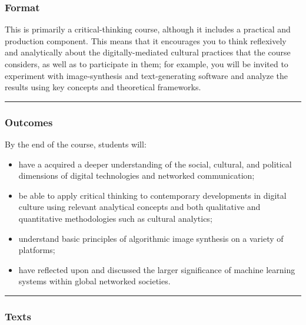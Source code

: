 \documentclass[
  letterpaper,
  DIV=11,
  numbers=noendperiod]{scrartcl}
\providecommand{\tightlist}{%
  \setlength{\itemsep}{0pt}\setlength{\parskip}{0pt}}\usepackage{longtable,booktabs,array}
\begin{document}
\hypertarget{format}{%
\subsubsection{Format}\label{format}}

This is primarily a critical-thinking course, although it includes a
practical and production component. This means that it encourages you to
think reflexively and analytically about the digitally-mediated cultural
practices that the course considers, as well as to participate in them;
for example, you will be invited to experiment with image-synthesis and
text-generating software and analyze the results using key concepts and
theoretical frameworks.

\begin{center}\rule{0.5\linewidth}{0.5pt}\end{center}

\hypertarget{outcomes}{%
\subsubsection{Outcomes}\label{outcomes}}

By the end of the course, students will:

\begin{itemize}
\tightlist
\item
  have a acquired a deeper understanding of the social, cultural, and
  political dimensions of digital technologies and networked
  communication;
\item
  be able to apply critical thinking to contemporary developments in
  digital culture using relevant analytical concepts and both
  qualitative and quantitative methodologies such as cultural analytics;
\item
  understand basic principles of algorithmic image synthesis on a
  variety of platforms;
\item
  have reflected upon and discussed the larger significance of machine
  learning systems within global networked societies.
\end{itemize}

\begin{center}\rule{0.5\linewidth}{0.5pt}\end{center}

\hypertarget{texts}{%
\subsubsection{Texts}\label{texts}}
\end{document}
